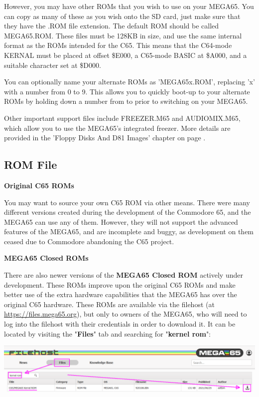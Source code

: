 However, you may have other ROMs that you wish to
use on your MEGA65.
You can copy as many of these as you wish onto the
SD card, just make sure that they have the .ROM file extension.  The default ROM
should be called MEGA65.ROM. These files
must be 128KB in size, and use the same internal format as the ROMs
intended for the C65.  This means that the C64-mode KERNAL must be
placed at offset \$E000, a C65-mode BASIC at \$A000, and a suitable
character set at \$D000.

You can optionally name your alternate ROMs as 'MEGA65x.ROM', replacing 'x' with a number from 0 to 9.
This allows you to quickly boot-up to your alternate ROMs by holding down a number from  to  prior
to switching on your MEGA65.

Other important support files include FREEZER.M65 and AUDIOMIX.M65, which
allow you to use the MEGA65's integrated freezer. More details are provided in the 'Floppy Disks And D81 Images'
chapter on page \pageref{cha:freezer}.

\subsection{ROM File}

\textbf{Original C65 ROMs}

You may want to source your own C65 ROM via other means.
There were many different versions created during the development of the Commodore 65,
and the MEGA65 can use any of them.  However, they will not support the advanced
features of the MEGA65, and are incomplete and buggy, as development on them ceased
due to Commodore abandoning the C65 project.

\textbf{MEGA65 Closed ROMs}

There are also newer versions of the \textbf{MEGA65 Closed ROM} actively under development. These ROMs improve upon the original C65 ROMs and make better use of the extra hardware capabilities that the MEGA65 has over the original C65 hardware. These ROMs are available via the filehost (at \url{https://files.mega65.org}), but only to owners of the MEGA65, who will need to log into the filehost with their credentials in order to download it. It can be located by visiting the "\textbf{Files}" tab and searching for "\textbf{kernel rom}":

\includegraphics[width=\linewidth]{images/latest_closed_rom.png}


